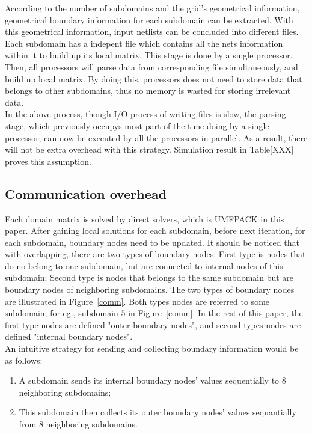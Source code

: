 \documentclass{sig-alternate}
\begin{document}
	According to the number of subdomains and the grid's geometrical information, geometrical boundary information for each
	subdomain can be extracted. With this geometrical information, input netlists can be concluded into different files.
	Each subdomain has a indepent file which contains all the nets information within it to build up its local matrix. 
	This stage is done by a single processor. Then, all processors will parse data from corresponding file simultaneously, and build 
	up local matrix. By doing this, processors does not need to store data that belongs to other subdomains, thus no memory is 
	wasted for storing irrelevant data. \\

	In the above process, though I/O process of writing files is slow, the parsing stage, which previously occupys most part of the 
	time doing by a single processor, can now be executed by all the processors in parallel. As a result, there will not be extra
	overhead with this strategy. Simulation result in Table[XXX] proves this assumption.\\
	 
     \subsection{Communication overhead}
	Each domain matrix is solved by direct solvers, which is UMFPACK in this paper. After gaining local solutions for each subdomain, 
	before next iteration, for each subdomain, boundary nodes need to be updated. It should be noticed that with overlapping, there
	are two types of boundary nodes: First type is nodes that do no belong to one subdomain, but are connected to internal nodes of 
	this subdomain; Second type is nodes that belongs to the same subdomain but are boundary nodes of neighboring subdomains. The 
	two types of boundary nodes are illustrated in Figure~\ref{comm}. Both types nodes are referred to some subdomain, for eg., 
	subdomain $5$ in Figure~\ref{comm}. In the rest of this paper, the first type nodes are defined
	"outer boundary nodes", and second types nodes are defined "internal boundary nodes".\\ 

	An intuitive strategy for sending and collecting boundary information would be as follows:

	\begin{enumerate}[1.]
	  \item A subdomain sends its internal boundary nodes' values sequentially to 8 neighboring subdomains;
	  \item This subdomain then collects its outer boundary nodes' values sequantially from 8 neighboring subdomains.
	\end{enumerate}	
\end{document}
